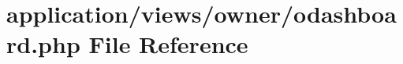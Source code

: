 \hypertarget{odashboard_8php}{}\section{application/views/owner/odashboard.php File Reference}
\label{odashboard_8php}
